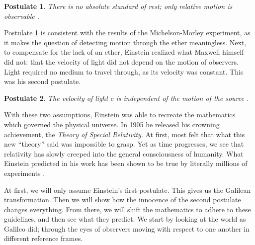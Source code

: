 \documentclass[12pt]{article}
\theoremstyle{defn}
\theoremstyle{pf}
\newtheorem{post}{Postulate}
\newcommand{\0}{\emptyset}
\renewcommand{\-}{\setminus}
\begin{document}
\begin{post}\label{post1}There is no absolute standard of rest; only relative motion is observable \cite{woodhouse}.
\end{post}

Postulate \ref{post1} is consistent with the results of the Michelson-Morley experiment, as it makes the question of detecting motion through the ether meaningless. Next, to compensate for the lack of an ether, Einstein realized what Maxwell himself did not: that the velocity of light did not depend on the motion of observers. Light required no medium to travel through, as its velocity was constant. This was his second postulate.

\begin{post}\label{post2}The velocity of light $c$ is independent of the motion of the source \cite{jackson}.
\end{post}

With these two assumptions, Einstein was able to recreate the mathematics which governed the physical universe. In 1905 he released his crowning achievement, the \textit{Theory of Special Relativity}. At first, most felt that what this new ``theory'' said was impossible to grasp. Yet as time progresses, we see that relativity has slowly creeped into the general consciousness of humanity. What Einstein predicted in his work has been shown to be true by literally millions of experiments \cite{kaku}.

At first, we will only assume Einstein's first postulate. This gives us the Galilean transformation. Then we will show how the innocence of the second postulate changes everything. From there, we will shift the mathematics to adhere to these guidelines, and then see what they predict. We start by looking at the world as Galileo did; through the eyes of observers moving with respect to one another in different reference frames.
\end{document}
